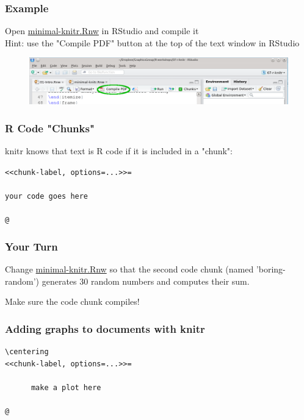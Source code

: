 \documentclass{beamer}\usepackage[]{graphicx}\usepackage[]{color}
\begin{document}

\begin{frame}
\frametitle{Example}
Open \href{../code/minimal-knitr.Rnw}{minimal-knitr.Rnw} in RStudio and compile it\\\bigskip
Hint: use the "Compile PDF" button at the top of the text window in RStudio\\\bigskip
\begin{figure}
\centering
\includegraphics[keepaspectratio=T,width=\textwidth]{figure/compilePdfRstudio}
\end{figure}
\end{frame}


\begin{frame}
\frametitle{R Code "Chunks"}
knitr knows that text is R code if it is included in a "chunk": \bigskip\bigskip

\texttt{<<chunk-label, options=...>>=}\\
\hspace{10pt}\\
\hspace{30pt}\texttt{your code goes here}\\
\hspace{10pt}\\
\texttt{@}\\

\end{frame}


\begin{frame}
\frametitle{Your Turn}
Change \href{../code/minimal-knitr.Rnw}{minimal-knitr.Rnw} so that the second code chunk (named 'boring-random') generates 30 random numbers and computes their sum. \bigskip

Make sure the code chunk compiles!
\end{frame}


\begin{frame}[fragile]
\frametitle{Adding graphs to documents with knitr}
\begin{verbatim}
\centering
<<chunk-label, options=...>>=

      make a plot here

@
\end{verbatim}
\end{frame}
\end{document}
